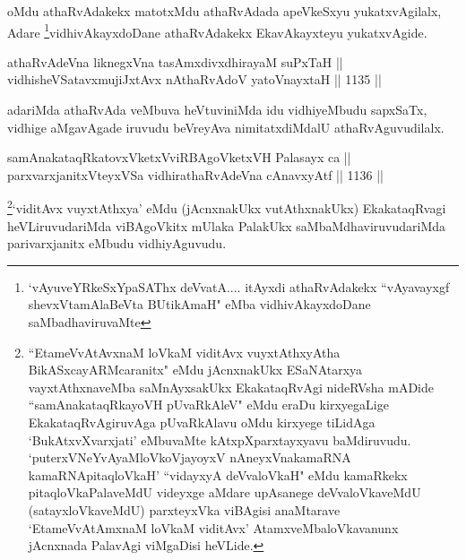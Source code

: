 \begin{artha}
oMdu athaRvAdakekx matotxMdu athaRvAdada apeVkeSxyu yukatxvAgilalx, Adare \footnote{`vAyuveYRkeSxYpaSAThx deVvatA.... itAyxdi athaRvAdakekx ``vAyavayxgf shevxVtamAlaBeVta BUtikAmaH" eMba vidhivAkayxdoDane saMbadhaviruvaMte}vidhivAkayxdoDane athaRvAdakekx EkavAkayxteyu yukatxvAgide.
\end{artha}

\begin{shl}
athaRvAdeVna liknegxVna tasAmxdivxdhirayaM suPxTaH || \\
vidhisheVSatavxmujiJxtAvx nAthaRvAdoV yatoV\s nayxtaH \hfill || 1135 ||  
\end{shl}

\begin{artha}
adariMda athaRvAda veMbuva heVtuviniMda idu vidhi\-\break yeMbudu sapxSaTx, vidhige aMgavAgade iruvudu beVreyAva nimitatxdiMdalU athaRvAguvudilalx.
\end{artha}


\begin{shl}
samAnakataqRkatovxVketxVviRBAgoVketxVH Palasayx ca || \\
parxvarxjanitxVteyxVSa vidhirathaRvAdeVna cAnavxyAtf \hfill || 1136 ||  
\end{shl}

\begin{artha}
\footnote{``EtameVvA\s \s tAvxnaM loVkaM viditAvx vuyxtAthxyAtha BikASxcayARMcaranitx" eMdu jAcnxnakUkx ESaNAtarxya vayxtAthxnaveMba saMnAyxsakUkx EkakataqRvAgi nideRVsha mADide ``samAnakataqRkayoVH pUvaRkAleV" eMdu eraDu kirxyegaLige EkakataqRvAgiruvAga pUvaRkAlavu oMdu kirxyege tiLidAga `BukAtxvXvarxjati' eMbuvaMte kAtxpXparxtayxyavu baMdiruvudu. `puterxVNeYvAyaMloVkoVjayoyxV nAneyxVnakamaRNA kamaRNApitaqloVkaH' ``vidayxyA deVvaloVkaH" eMdu kamaRkekx pitaqloVkaPalaveMdU videyxge aMdare upAsanege deVvaloVkaveMdU (satayxloVkaveMdU) parxteyxVka viBAgisi anaMtarave `EtameVvA\s \s tAmxnaM loVkaM viditAvx' AtamxveMbaloVkavanunx jAcnxnada PalavAgi viMgaDisi heVLide.}`viditAvx vuyxtAthxya' eMdu (jAcnxnakUkx vutAthxnakUkx) EkakataqRvagi heVLiruvudariMda viBAgoVkitx mUlaka PalakUkx saMbaMdhaviruvudariMda parivarxjanitx eMbudu vidhiyAguvudu.
\end{artha}


